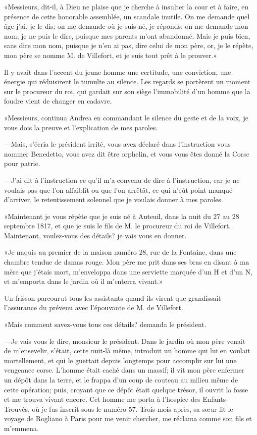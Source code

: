 «Messieurs, dit-il, à Dieu ne plaise que je cherche à insulter la cour et à faire, en présence de cette honorable assemblée, un scandale inutile. On me demande quel âge j'ai, je le dis; on me demande où je suis né, je réponds; on me demande mon nom, je ne puis le dire, puisque mes parents m'ont abandonné. Mais je puis bien, sans dire mon nom, puisque je n'en ai pas, dire celui de mon père, or, je le répète, mon père se nomme M. de Villefort, et je suis tout prêt à le prouver.» 

Il y avait dans l'accent du jeune homme une certitude, une conviction, une énergie qui réduisirent le tumulte au silence. Les regards se portèrent un moment sur le procureur du roi, qui gardait sur son siège l'immobilité d'un homme que la foudre vient de changer en cadavre. 

«Messieurs, continua Andrea en commandant le silence du geste et de la voix, je vous dois la preuve et l'explication de mes paroles. 

—Mais, s'écria le président irrité, vous avez déclaré dans l'instruction vous nommer Benedetto, vous avez dit être orphelin, et vous vous êtes donné la Corse pour patrie. 

—J'ai dit à l'instruction ce qu'il m'a convenu de dire à l'instruction, car je ne voulais pas que l'on affaiblît ou que l'on arrêtât, ce qui n'eût point manqué d'arriver, le retentissement solennel que je voulais donner à mes paroles. 

«Maintenant je vous répète que je suis né à Auteuil, dans la nuit du 27 au 28 septembre 1817, et que je suis le fils de M. le procureur du roi de Villefort. Maintenant, voulez-vous des détails? je vais vous en donner. 

«Je naquis au premier de la maison numéro 28, rue de la Fontaine, dans une chambre tendue de damas rouge. Mon père me prit dans ses bras en disant à ma mère que j'étais mort, m'enveloppa dans une serviette marquée d'un H et d'un N, et m'emporta dans le jardin où il m'enterra vivant.» 

Un frisson parcourut tous les assistants quand ils virent que grandissait l'assurance du prévenu avec l'épouvante de M. de Villefort. 

«Mais comment savez-vous tous ces détails? demanda le président. 

—Je vais vous le dire, monsieur le président. Dans le jardin où mon père venait de m'ensevelir, s'était, cette nuit-là même, introduit un homme qui lui en voulait mortellement, et qui le guettait depuis longtemps pour accomplir sur lui une vengeance corse. L'homme était caché dans un massif; il vit mon père enfermer un dépôt dans la terre, et le frappa d'un coup de couteau au milieu même de cette opération; puis, croyant que ce dépôt était quelque trésor, il ouvrit la fosse et me trouva vivant encore. Cet homme me porta à l'hospice des Enfants-Trouvés, où je fus inscrit sous le numéro 57. Trois mois après, sa sœur fit le voyage de Rogliano à Paris pour me venir chercher, me réclama comme son fils et m'emmena. 

